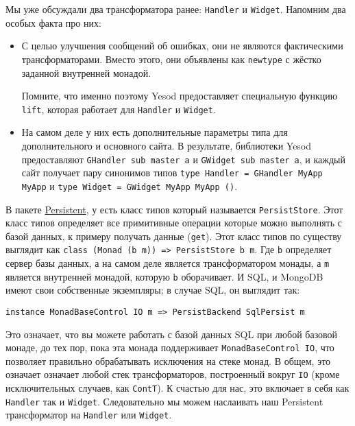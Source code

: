 Мы уже обсуждали два трансформатора ранее: \lstinline'Handler' и \lstinline'Widget'.
Напомним два особых факта про них:
\begin{itemize}
\item  С целью улучшения сообщений об ошибках, они не являются фактическими
трансформаторами. Вместо этого, они объявлены как \lstinline'newtype' с жёстко заданной
внутренней монадой. 
\begin{remark}Помните, что именно поэтому Yesod предоставляет специальную функцию
\lstinline'lift', которая работает для \lstinline'Handler' и \lstinline'Widget'.
\end{remark}
\item  На самом деле у них есть дополнительные параметры типа для дополнительного и
основного сайта. В результате, библиотеки Yesod предоставляют 
\lstinline'GHandler sub master a' и \lstinline'GWidget sub master a', и каждый сайт
получает пару синонимов типов \lstinline'type Handler = GHandler MyApp MyApp' и
\lstinline'type Widget = GWidget MyApp MyApp ()'.
\end{itemize}

В пакете \hyperref[chap:persistent]{Persistent}, у есть класс типов который называется
\lstinline'PersistStore'. Этот класс типов
определяет все примитивные операции которые можно выполнять с базой данных, к примеру
получать данные (\lstinline'get'). Этот класс типов по существу выглядит как 
\lstinline'class (Monad (b m)) => PersistStore b m'. Где \lstinline'b' определяет сервер
базы данных, а на самом деле является трансформатором монады, а \lstinline'm' является
внутренней монадой, которую \lstinline'b' оборачивает. И SQL, и MongoDB имеют свои
собственные экземпляры; в случае SQL, он выглядит
так:

\begin{lstlisting}
instance MonadBaseControl IO m => PersistBackend SqlPersist m
\end{lstlisting}

Это означает, что вы можете работать с базой данных SQL при любой базовой монаде, до тех 
пор, пока эта монада поддерживает \lstinline'MonadBaseControl IO', что позволяет правильно
обрабатывать исключения на стеке монад. В общем, это означает означает любой стек
трансформаторов, построенный вокруг \lstinline'IO' (кроме исключительных случаев, как
\lstinline'ContT'). К счастью для нас, это включает в себя как \lstinline'Handler' так и
\lstinline'Widget'. Следовательно мы можем наслаивать наш Persistent трансформатор на
\lstinline'Handler' или \lstinline'Widget'.

